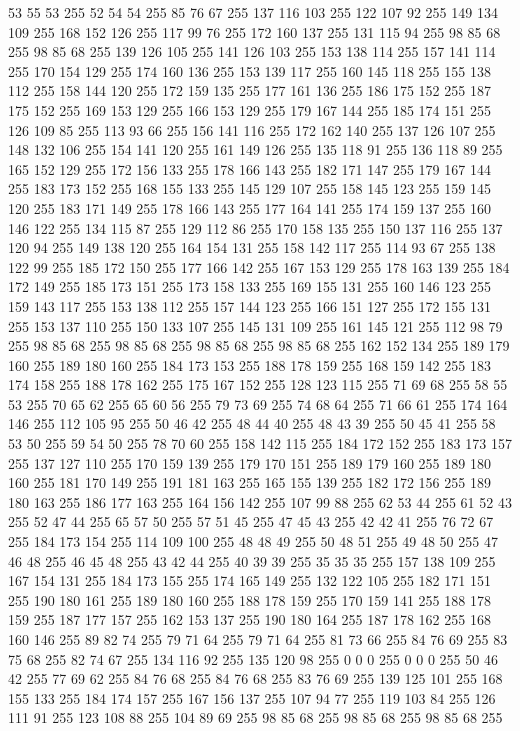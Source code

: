53 55 53 255 52 54 54 255 85 76 67 255 137 116 103 255 122 107 92 255 149 134 109 255 168 152 126 255 117 99 76 255 172 160 137 255 131 115 94 255 98 85 68 255 98 85 68 255 139 126 105 255 141 126 103 255 153 138 114 255 157 141 114 255 170 154 129 255 174 160 136 255 153 139 117 255 160 145 118 255 155 138 112 255 158 144 120 255 172 159 135 255 177 161 136 255 186 175 152 255 187 175 152 255 169 153 129 255 166 153 129 255 179 167 144 255 185 174 151 255 126 109 85 255 113 93 66 255 156 141 116 255 172 162 140 255 137 126 107 255 148 132 106 255 154 141 120 255 161 149 126 255 135 118 91 255 136 118 89 255 165 152 129 255 172 156 133 255 178 166 143 255 182 171 147 255 179 167 144 255 183 173 152 255 168 155 133 255 145 129 107 255 158 145 123 255 159 145 120 255 183 171 149 255 178 166 143 255 177 164 141 255 174 159 137 255 160 146 122 255 134 115 87 255 129 112 86 255 170 158 135 255 150 137 116 255 137 120 94 255 149 138 120 255 164 154 131 255 158 142 117 255 114 93 67 255
138 122 99 255 185 172 150 255 177 166 142 255 167 153 129 255 178 163 139 255 184 172 149 255 185 173 151 255 173 158 133 255 169 155 131 255 160 146 123 255 159 143 117 255 153 138 112 255 157 144 123 255 166 151 127 255 172 155 131 255 153 137 110 255 150 133 107 255 145 131 109 255 161 145 121 255 112 98 79 255 98 85 68 255 98 85 68 255 98 85 68 255 98 85 68 255 162 152 134 255 189 179 160 255 189 180 160 255 184 173 153 255 188 178 159 255 168 159 142 255 183 174 158 255 188 178 162 255 175 167 152 255 128 123 115 255 71 69 68 255 58 55 53 255 70 65 62 255 65 60 56 255 79 73 69 255 74 68 64 255 71 66 61 255 174 164 146 255 112 105 95 255 50 46 42 255 48 44 40 255 48 43 39 255 50 45 41 255 58 53 50 255 59 54 50 255 78 70 60 255 158 142 115 255 184 172 152 255 183 173 157 255 137 127 110 255 170 159 139 255 179 170 151 255 189 179 160 255 189 180 160 255 181 170 149 255 191 181 163 255 165 155 139 255 182 172 156 255 189 180 163 255 186 177 163 255
164 156 142 255 107 99 88 255 62 53 44 255 61 52 43 255 52 47 44 255 65 57 50 255 57 51 45 255 47 45 43 255 42 42 41 255 76 72 67 255 184 173 154 255 114 109 100 255 48 48 49 255 50 48 51 255 49 48 50 255 47 46 48 255 46 45 48 255 43 42 44 255 40 39 39 255 35 35 35 255 157 138 109 255 167 154 131 255 184 173 155 255 174 165 149 255 132 122 105 255 182 171 151 255 190 180 161 255 189 180 160 255 188 178 159 255 170 159 141 255 188 178 159 255 187 177 157 255 162 153 137 255 190 180 164 255 187 178 162 255 168 160 146 255 89 82 74 255 79 71 64 255 79 71 64 255 81 73 66 255 84 76 69 255 83 75 68 255 82 74 67 255 134 116 92 255 135 120 98 255 0 0 0 255 0 0 0 255 50 46 42 255 77 69 62 255 84 76 68 255 84 76 68 255 83 76 69 255 139 125 101 255 168 155 133 255 184 174 157 255 167 156 137 255 107 94 77 255 119 103 84 255 126 111 91 255 123 108 88 255 104 89 69 255 98 85 68 255 98 85 68 255 98 85 68 255
